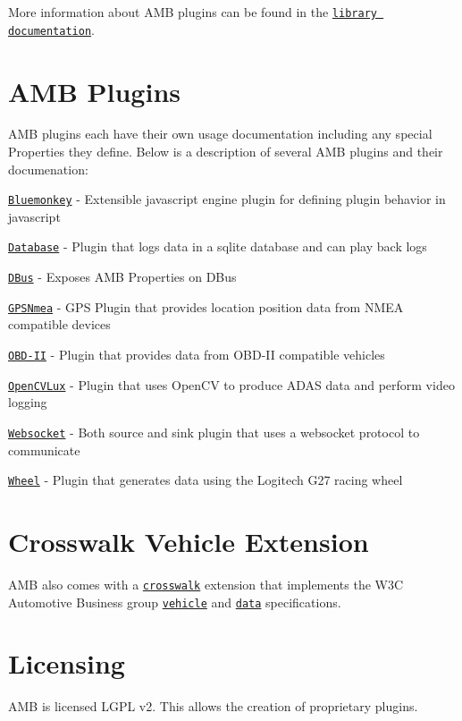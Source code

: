 More information about A\+M\+B plugins can be found in the \href{../amb/html/index.html}{\tt library documentation}. \hypertarget{index_plugins}{}\section{A\+M\+B Plugins}\label{index_plugins}
A\+M\+B plugins each have their own usage documentation including any special Properties they define. Below is a description of several A\+M\+B plugins and their documenation\+:
\begin{DoxyItemize}
\item \href{../plugins/bluemonkey.README}{\tt Bluemonkey} -\/ Extensible javascript engine plugin for defining plugin behavior in javascript
\item \href{../plugins/database.README}{\tt Database} -\/ Plugin that logs data in a sqlite database and can play back logs
\item \href{../plugins/dbus.README}{\tt D\+Bus} -\/ Exposes A\+M\+B Properties on D\+Bus
\item \href{../plugins/gpsnmea.README}{\tt G\+P\+S\+Nmea} -\/ G\+P\+S Plugin that provides location position data from N\+M\+E\+A compatible devices
\item \href{../plugins/obd2.README}{\tt O\+B\+D-\/\+I\+I} -\/ Plugin that provides data from O\+B\+D-\/\+I\+I compatible vehicles
\item \href{../plugins/opencvlux.README}{\tt Open\+C\+V\+Lux} -\/ Plugin that uses Open\+C\+V to produce A\+D\+A\+S data and perform video logging
\item \href{../plugins/websocket.README}{\tt Websocket} -\/ Both source and sink plugin that uses a websocket protocol to communicate
\item \href{../plugins/wheel.README}{\tt Wheel} -\/ Plugin that generates data using the Logitech G27 racing wheel 
\end{DoxyItemize}\hypertarget{index_crosswalk}{}\section{Crosswalk Vehicle Extension}\label{index_crosswalk}
A\+M\+B also comes with a \href{http://crosswalk-project.org}{\tt crosswalk} extension that implements the W3\+C Automotive Business group \href{https://rawgit.com/w3c/automotive-bg/master/vehicle_spec.html}{\tt vehicle} and \href{https://rawgit.com/w3c/automotive-bg/master/data_spec.html}{\tt data} specifications. \hypertarget{index_licensing}{}\section{Licensing}\label{index_licensing}
A\+M\+B is licensed L\+G\+P\+L v2. This allows the creation of proprietary plugins. 